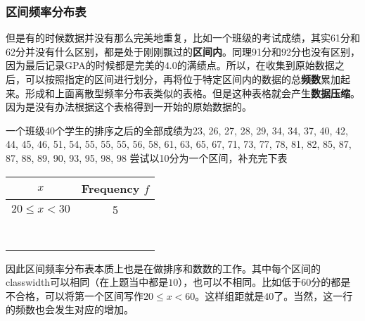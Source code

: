 \subsubsection*{区间频率分布表}
\label{subsubsec:freq distribution}
但是有的时候数据并没有那么完美地重复，比如一个班级的考试成绩，其实61分和62分并没有什么区别，都是处于刚刚飘过的\textbf{区间内}。同理91分和92分也没有区别，因为最后记录GPA的时候都是完美的$4.0$的满绩点。所以，在收集到原始数据之后，可以按照指定的区间进行划分，再将位于特定区间内的数据的总\textbf{频数}累加起来。形成和上面离散型频率分布表类似的表格。但是这种表格就会产生\textbf{数据压缩}。因为是没有办法根据这个表格得到一开始的原始数据的。
\begin{TaskBox}
一个班级40个学生的排序之后的全部成绩为23, 26, 27, 28, 29, 34, 34, 37, 40, 42, 44, 45, 46, 51, 54, 55, 55, 55, 56, 58, 61, 63, 65, 67, 71, 73, 77, 78, 81, 82, 85, 87, 87, 88, 89, 90, 93, 95, 98, 98
尝试以10分为一个区间，补充完下表
\begin{table}[H]
\centering
\begin{tabular}{|c|c|}
\hline
$x$                 & Frequency $f$ \\ \hline
$20\leqslant x< 30$ & 5             \\ \hline
                    &             \\ \hline
                    &             \\ \hline
                    &               \\ \hline
                    &               \\ \hline
                    &               \\ \hline
                    &               \\ \hline
                    &               \\ \hline
\end{tabular}
\end{table}
\end{TaskBox}
因此区间频率分布表本质上也是在做排序和数数的工作。其中每个区间的\gls{classwidth}可以相同（在上题当中都是$10$），也可以不相同。比如低于$60$分的都是不合格，可以将第一个区间写作$20\leqslant x< 60$。这样组距就是$40$了。当然，这一行的频数也会发生对应的增加。

